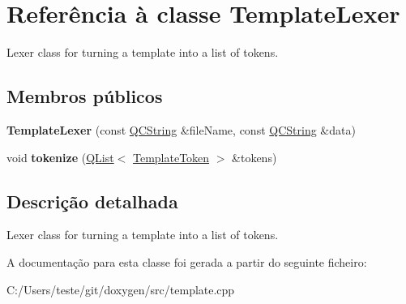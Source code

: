 \hypertarget{class_template_lexer}{\section{Referência à classe Template\-Lexer}
\label{class_template_lexer}
}


Lexer class for turning a template into a list of tokens.  


\subsection*{Membros públicos}
\begin{DoxyCompactItemize}
\item 
\hypertarget{class_template_lexer_a4776dfdbb80e25085420224d1a5dea86}{{\bfseries Template\-Lexer} (const \hyperlink{class_q_c_string}{Q\-C\-String} \&file\-Name, const \hyperlink{class_q_c_string}{Q\-C\-String} \&data)}\label{class_template_lexer_a4776dfdbb80e25085420224d1a5dea86}

\item 
\hypertarget{class_template_lexer_a94d3362c3dc62252e2a9f89c718274e1}{void {\bfseries tokenize} (\hyperlink{class_q_list}{Q\-List}$<$ \hyperlink{class_template_token}{Template\-Token} $>$ \&tokens)}\label{class_template_lexer_a94d3362c3dc62252e2a9f89c718274e1}

\end{DoxyCompactItemize}


\subsection{Descrição detalhada}
Lexer class for turning a template into a list of tokens. 

A documentação para esta classe foi gerada a partir do seguinte ficheiro\-:\begin{DoxyCompactItemize}
\item 
C\-:/\-Users/teste/git/doxygen/src/template.\-cpp\end{DoxyCompactItemize}
